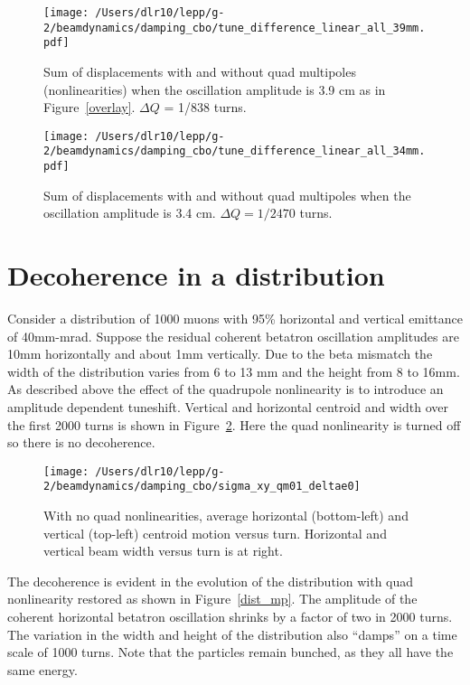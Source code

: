 \documentclass[10pt]{report}
\begin{document}
\begin{figure}[htbp] %
\begin{minipage}[t]{0.48\textwidth}
   \centering
   \texttt{[image: /Users/dlr10/lepp/g-2/beamdynamics/damping\_cbo/tune\_difference\_linear\_all\_39mm.pdf]} 
   \caption{Sum of displacements with and without quad multipoles (nonlinearities) when the oscillation amplitude is 3.9 cm as in 
Figure~\ref{overlay}. $\Delta Q$ = 1/838 turns. \label{difference39}}
 \end{minipage}
\hfill
\begin{minipage}[t]{0.48\textwidth}
\centering
   \texttt{[image: /Users/dlr10/lepp/g-2/beamdynamics/damping\_cbo/tune\_difference\_linear\_all\_34mm.pdf]} 
\caption{Sum of displacements with and without quad multipoles when the oscillation amplitude is 3.4 cm. $\Delta Q = 1/2470$ turns. 
   \label{difference34}}
\end{minipage}
\end{figure}

\section*{Decoherence in a distribution}
Consider a distribution of 1000 muons with 95\% horizontal and vertical emittance of 40mm-mrad. Suppose the residual coherent 
betatron oscillation amplitudes are 10mm horizontally and about 1mm vertically. Due to the beta mismatch the width of the distribution
varies from 6 to 13 mm and the height from 8 to 16mm. As described above the effect of the quadrupole nonlinearity
is to introduce an amplitude dependent tuneshift.  Vertical and horizontal centroid and width over the first 2000 turns
is shown in Figure~\ref{distribution_nomp}. Here the quad nonlinearity is turned off so there is no decoherence.
 

\begin{figure}[htbp] %
   \centering
   \texttt{[image: /Users/dlr10/lepp/g-2/beamdynamics/damping\_cbo/sigma\_xy\_qm01\_deltae0]} 
   \caption{With no quad nonlinearities, average horizontal (bottom-left) and vertical (top-left) centroid motion versus turn.
Horizontal and vertical beam width versus turn is at right. \label{distribution_nomp}}
\end{figure}
The decoherence is evident in the evolution of the distribution with quad nonlinearity restored as shown in Figure~\ref{dist_mp}. 
The amplitude of the coherent horizontal betatron oscillation shrinks by a factor of two
in 2000 turns. The variation in the width and height of the distribution also ``damps'' on a time
scale of 1000 turns. Note that the particles remain bunched, as they all have the same energy.
\end{document}
